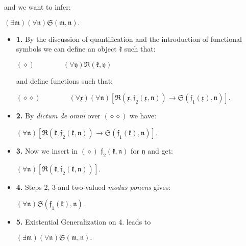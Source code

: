 \documentclass[12pt]{article}
\begin{document}
\begin{enumerate}
\begin{itemize}
and we want to infer:

\begin{center}
$(\exists \mathfrak{m}) (\forall \mathfrak{n}) \mathfrak{S} (\mathfrak{m}, \mathfrak{n}).$
\end{center}

\begin{itemize}
\item \textbf{1.} By the discussion of quantification and the introduction of functional symbols we can define an object $\mathfrak{k}$ such that:

\begin{center}
$(\diamond) \qquad \qquad (\forall \mathfrak{y}) \mathfrak{R} (\mathfrak{k}, \mathfrak{y})$
\end{center}

and define functions such that:

\begin{center}
$(\diamond \diamond) \qquad \qquad (\forall \mathfrak{x}) (\forall \mathfrak{n}) [\mathfrak{R} (\mathfrak{x}, \mathfrak{f}_2 (\mathfrak{x}, \mathfrak{n})) \rightarrow \mathfrak{S} (\mathfrak{f}_1 (\mathfrak{x}), \mathfrak{n})].$
\end{center}

\item \textbf{2.} By \emph{dictum de omni} over $(\diamond \diamond)$ we have:

\begin{center}
$(\forall \mathfrak{n}) [\mathfrak{R} (\mathfrak{k}, \mathfrak{f}_2 (\mathfrak{k}, \mathfrak{n})) \rightarrow \mathfrak{S} (\mathfrak{f}_1 (\mathfrak{k}), \mathfrak{n})].$
\end{center}

\item \textbf{3.} Now we insert in $(\diamond)$ $\mathfrak{f}_2 (\mathfrak{k}, \mathfrak{n})$ for $\mathfrak{y}$ and get:

\begin{center}
$(\forall \mathfrak{n}) [\mathfrak{R} (\mathfrak{k}, \mathfrak{f}_2 (\mathfrak{k}, \mathfrak{n}))].$
\end{center}

\item \textbf{4.} Steps 2, 3 and two-valued \emph{modus ponens} gives:

\begin{center}
$(\forall \mathfrak{n}) \mathfrak{S} (\mathfrak{f}_1 (\mathfrak{k}), \mathfrak{n}).$
\end{center}

\item \textbf{5.} Existential Generalization on 4. leads to

\begin{center}
$(\exists \mathfrak{m}) (\forall \mathfrak{n}) \mathfrak{S} (\mathfrak{m}, \mathfrak{n}).$
\end{center}
\end{itemize}

\end{itemize}

\end{enumerate}
\end{document}
